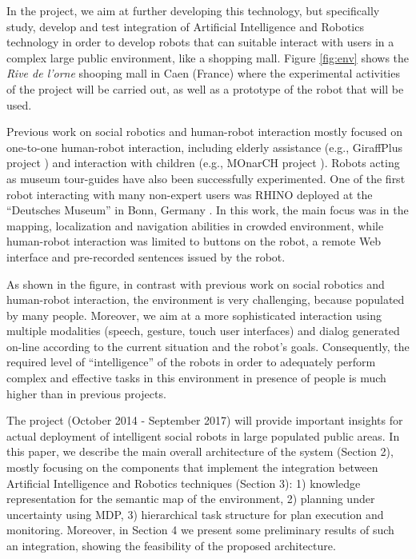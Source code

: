 In the \coaches project, we aim at further developing this technology, but specifically study, develop and test integration of Artificial Intelligence and Robotics technology in order to develop robots that can suitable interact with users in a complex large public environment, like a shopping mall.
Figure \ref{fig:env} shows the \emph{Rive de l'orne} shooping mall in Caen (France) where the experimental activities of the project will be carried out, as well as a prototype of the robot that will be used.

Previous work on social robotics and human-robot interaction mostly focused on one-to-one human-robot interaction, including elderly assistance (e.g., GiraffPlus project \cite{CoCe14}) and interaction with children (e.g., MOnarCH project \cite{FeSe14}). Robots acting as museum tour-guides have also been successfully experimented. One of the first robot interacting with many non-expert users was RHINO deployed at the ``Deutsches Museum'' in Bonn,
Germany \cite{BuCr98}. In this work, the main focus was in the mapping, localization and navigation abilities in crowded environment, while human-robot interaction was limited to buttons on the robot, a remote Web interface and pre-recorded sentences issued by the robot.

As shown in the figure, in contrast with previous work on social robotics and human-robot interaction, the \coaches environment is very challenging, because populated by many people.
Moreover, we aim at a more sophisticated interaction using multiple modalities (speech, gesture, touch user interfaces) and dialog generated on-line according to the current situation
and the robot's goals.
Consequently, the required level of ``intelligence'' of the \coaches robots in order to adequately perform complex and effective tasks in this environment in presence of people is much higher than in previous projects.

The \coaches project (October 2014 - September 2017) will provide important insights for actual deployment of intelligent social robots in large populated public areas. 
In this paper, we describe the main overall architecture of the system (Section 2), mostly focusing on the components that implement the integration between Artificial Intelligence and Robotics techniques (Section 3): 1) knowledge representation for the semantic map of the environment,
2) planning under uncertainty using MDP, 3) hierarchical task structure for plan execution and monitoring. 
Moreover, in Section 4 we present some preliminary results of such an integration, showing the feasibility of the proposed architecture.



